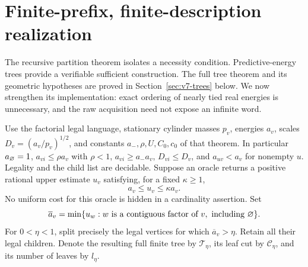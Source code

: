 \section{Finite-prefix, finite-description realization}
\label{sec:v8-certified}
The recursive partition theorem isolates a necessity condition.
Predictive-energy trees provide a verifiable sufficient construction.
The full tree theorem and its geometric hypotheses are proved in
Section~\ref{sec:v7-trees} below. We now strengthen its implementation:
exact ordering of nearly tied real energies is unnecessary, and the raw
acquisition need not expose an infinite word.

Use the factorial legal language, stationary cylinder masses $p_v$,
energies $a_v$, scales $D_v=(a_v/p_v)^{1/2}$, and constants
$a_-,\rho,U,C_0,c_0$ of that theorem. In particular $a_\varnothing=1$,
$a_{vi}\le\rho a_v$ with $\rho<1$, $a_{vi}\ge a_-a_v$,
$D_{vi}\le D_v$, and $a_{uv}<a_v$ for nonempty $u$.
Legality and the child list are decidable. Suppose an oracle returns a
positive rational upper estimate $u_v$ satisfying, for a fixed
$\kappa\ge1$,
\begin{equation}
                         a_v\le u_v\le\kappa a_v.     \label{eq:v8-oracle}
\end{equation}
No uniform cost for this oracle is hidden in a cardinality assertion.
Set
\begin{equation}
 \overline a_v=\min\{u_w:w\text{ is a contiguous factor of }v,
                              \text{ including }\varnothing\}.      \label{eq:v8-factor-envelope}
\end{equation}
For $0<\eta<1$, split precisely the legal vertices for which
$\overline a_v>\eta$. Retain all their legal children. Denote the resulting
full finite tree by $\mathcal T_\eta$, its leaf cut by $\mathcal C_\eta$,
and its number of leaves by $l_\eta$.

